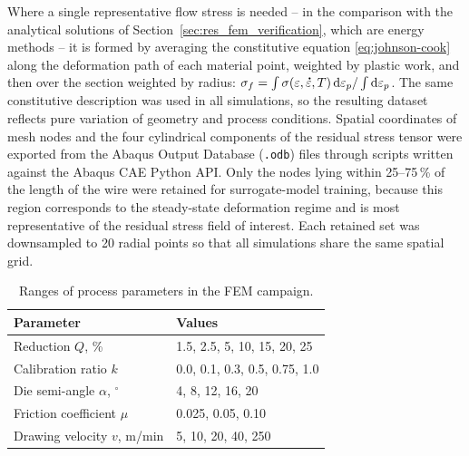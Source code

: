 \documentclass[subscriptcorrection,upint,varvw,barcolor=Goldenrod3,mathalfa=cal=euler,balance,hyphenate,french,pdf-a]{asmejour} %
\newcommand{\edot}{\accentset{\scalebox{0.4}{$\bullet$}}{\varepsilon}}
\begin{document}
Where a single representative flow stress is needed -- in the comparison with the analytical
solutions of Section~\ref{sec:res_fem_verification}, which are energy methods -- it is formed
by averaging the constitutive equation \eqref{eq:johnson-cook} along the deformation path of
each material point, weighted by plastic work, and then over the section weighted by radius:
$\sigma_f = \int\sigma(\varepsilon,\edot,T)\,\mathrm{d}\varepsilon_p /
\int\mathrm{d}\varepsilon_p$.
The same constitutive description was used in all simulations, so the resulting dataset reflects pure variation of geometry and process conditions. Spatial coordinates of mesh nodes and the four cylindrical components of the residual stress tensor were exported from the Abaqus Output Database (\texttt{.odb}) files through scripts written against the Abaqus CAE Python API. Only the nodes lying within 25--75\,\% of the length of the wire were retained for surrogate-model training, because this region corresponds to the steady-state deformation regime and is most representative of the residual stress field of interest. Each retained set was downsampled to 20 radial points so that all simulations share the same spatial grid.



\begin{table}[!h]
\centering
\caption{Ranges of process parameters in the FEM campaign.}
\label{tab:fem_params}
\small
\begin{tabularx}{\columnwidth}{@{}lX@{}}
\toprule
Parameter & Values \\
\midrule
Reduction $Q$, \% & 1.5, 2.5, 5, 10, 15, 20, 25 \\
Calibration ratio $k$ & 0.0, 0.1, 0.3, 0.5, 0.75, 1.0 \\
Die semi-angle $\alpha$, $^{\circ}$ & 4, 8, 12, 16, 20 \\
Friction coefficient $\mu$ & 0.025, 0.05, 0.10 \\
Drawing velocity $v$, m/min & 5, 10, 20, 40, 250 \\
\bottomrule
\end{tabularx}
\end{table}
\end{document}
